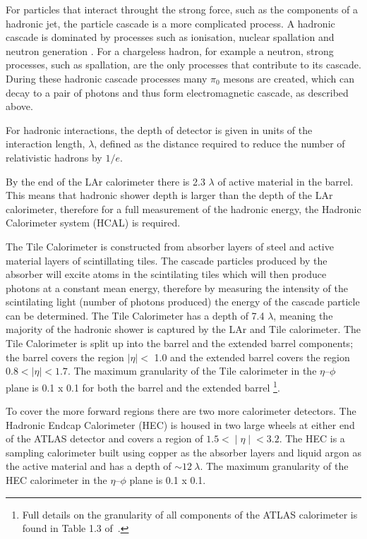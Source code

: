For particles that interact throught the strong force, such as the components of a hadronic jet,
the particle cascade is a more complicated process.
A hadronic cascade is dominated by processes such as
ionisation, nuclear spallation and neutron generation \cite{det-nuclearInt_book, det-thesis_kate}.
For a chargeless hadron, for example a neutron,
strong processes, such as spallation, are the only processes that contribute to its cascade.
During these hadronic cascade processes many $\pi_0$ mesons are created,
which can decay to a pair of photons and thus form electromagnetic cascade, as described above. 

For hadronic interactions, the depth of detector is given in units of the interaction length, $\lambda$,
defined as the distance required to reduce the number of relativistic hadrons by $1/e$.

By the end of the LAr calorimeter there is 2.3 $\lambda$ of active material in the barrel.
This means that hadronic shower depth is larger than the depth of the LAr calorimeter,
therefore for a full measurement of the hadronic energy, the Hadronic Calorimeter system (HCAL) is required. 

The Tile Calorimeter is constructed from absorber layers of steel and active material layers of scintillating tiles.
The cascade particles produced by the absorber will excite atoms in the scintilating tiles which will then produce photons at a constant mean energy,
therefore by measuring the intensity of the scintilating light (number of photons produced) the energy of the cascade particle can be determined.
The Tile Calorimeter has a depth of 7.4 $\lambda$, meaning the majority of the hadronic shower is captured by the LAr and Tile calorimeter.
The Tile Calorimeter is split up into the barrel and the extended barrel components;
the barrel covers the region $|\eta| <$ 1.0 and the extended barrel covers the region $0.8 < |\eta| < 1.7$.
The maximum granularity of the Tile calorimeter in the $\eta$--$\phi$ plane
is 0.1 x 0.1 for both the barrel and the extended barrel
\footnote{Full details on the granularity of all components of the ATLAS calorimeter is found in Table 1.3 of~\cite{det-ATLAS_Exp}.}. 


To cover the more forward regions there are two more calorimeter detectors.
The Hadronic Endcap Calorimeter (HEC) is housed in two large wheels at either end of the ATLAS detector
and covers a region of $1.5 < ∣\eta∣ < 3.2$.
The HEC is a sampling calorimeter built using copper as the absorber layers and liquid argon as the active material
and has a depth of $\sim 12~\lambda$.
The maximum granularity of the HEC calorimeter in the $\eta$--$\phi$ plane is 0.1 x 0.1.


